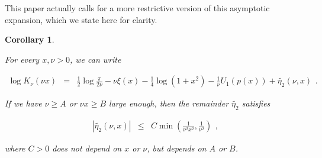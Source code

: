 \documentclass{jams-l}
\newtheorem{corollary}[theorem]{Corollary}
\theoremstyle{definition}
\theoremstyle{remark}
\numberwithin{equation}{section}
\begin{document}
        This paper actually calls for a more restrictive version of this asymptotic expansion, which we state here for clarity.
        
        \begin{corollary}
        \label{CorAsymptoticExpansionModifiedBessel}
        
            For every $x, \nu > 0$, we can write
            
            \[ \begin{array}{lll}
                    \log K_{\nu} \left( \nu x \right) & = & \frac{1}{2} \log \frac{\pi}{2 \nu} - \nu \xi \left( x \right) - \frac{1}{4} \log \left( 1 + x^2 \right) - \frac{1}{\nu} U_1 \left( p \left( x \right) \right) + \widetilde{\eta_2} \left( \nu, x \right)
                \end{array} . \]
                
            \noindent If we have $\nu \geqslant A$ or $\nu x \geqslant B$ large enough, then the remainder $\widetilde{\eta_2}$ satisfies
            
            \[ \begin{array}{lll}
                    \left \vert \widetilde{\eta_2} \left( \nu, x \right) \right \vert & \leqslant & C \min \left( \frac{1}{\nu^2 x^2}, \frac{1}{\nu^2} \right)
                \end{array} , \]
            
            \noindent where $C > 0$ does not depend on $x$ or $\nu$, but depends on $A$ or $B$.
        
        \end{corollary}
        
\end{document}
